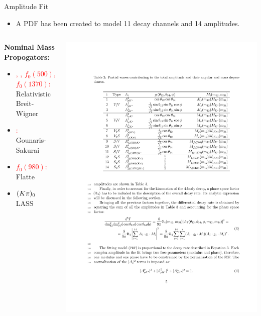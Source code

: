 \documentclass{beamer}
\begin{document}
\begin{frame}{Amplitude Fit}
  \scriptsize
  \begin{itemize}
  \item A PDF has been created to model 11 decay channels and 14 amplitudes.
  \end{itemize}
  \begin{columns}
    \begin{column}{0.3\textwidth}
      \textbf{Nominal Mass Propogators:}
      \begin{itemize}
      \item \textcolor{red}{\Kstarz, \Pomega, $f_0(500)$,$f_0(1370)$:}\\
        Relativistic Breit-Wigner
      \item \textcolor{red}{\rhoz:}\\
        Gounaris-Sakurai
      \item \textcolor{red}{$f_0(980)$:}\\
        Flatte
      \item \textcolor{red}{$(K\pi)_0$}\\
        LASS
      \end{itemize}
    \end{column}
    \begin{column}{0.69\textwidth}
      \includegraphics[width=\textwidth]{KstarRhoAmplitudes.pdf}

\end{column}
\end{columns}
\end{frame}
\end{document}
